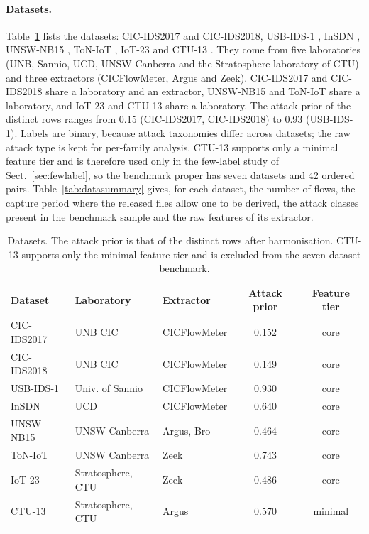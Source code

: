 \documentclass[pdflatex,sn-mathphys-num]{sn-jnl}%
\begin{document}
\paragraph{Datasets.}
Table~\ref{tab:datasets} lists the datasets: CIC-IDS2017 \citep{sharafaldin2018cicids} and CIC-IDS2018, USB-IDS-1 \citep{catillo2021usbids1}, InSDN \citep{elsayed2020insdn}, UNSW-NB15 \citep{moustafa2015unsw}, ToN-IoT \citep{alsaedi2020toniot}, IoT-23 \citep{garcia2020iot23} and CTU-13 \citep{garcia2014ctu13}.
They come from five laboratories (UNB, Sannio, UCD, UNSW Canberra and the Stratosphere laboratory of CTU) and three extractors (CICFlowMeter, Argus and Zeek).
CIC-IDS2017 and CIC-IDS2018 share a laboratory and an extractor, UNSW-NB15 and ToN-IoT share a laboratory, and IoT-23 and CTU-13 share a laboratory.
The attack prior of the distinct rows ranges from 0.15 (CIC-IDS2017, CIC-IDS2018) to 0.93 (USB-IDS-1).
Labels are binary, because attack taxonomies differ across datasets; the raw attack type is kept for per-family analysis.
CTU-13 supports only a minimal feature tier and is therefore used only in the few-label study of Sect.~\ref{sec:fewlabel}, so the benchmark proper has seven datasets and 42 ordered pairs.
Table~\ref{tab:datasummary} gives, for each dataset, the number of flows, the capture period where the released files allow one to be derived, the attack classes present in the benchmark sample and the raw features of its extractor.

\begin{table}[htbp]
\centering\small
\caption{Datasets. The attack prior is that of the distinct rows after harmonisation. CTU-13 supports only the minimal feature tier and is excluded from the seven-dataset benchmark.}\label{tab:datasets}
{\scriptsize\setlength{\tabcolsep}{2.5pt}\begin{tabular}{lllcc}
\toprule
Dataset & Laboratory & Extractor & Attack prior & Feature tier \\
\midrule
CIC-IDS2017 & UNB CIC & CICFlowMeter & 0.152 & core \\
CIC-IDS2018 & UNB CIC & CICFlowMeter & 0.149 & core \\
USB-IDS-1 & Univ. of Sannio & CICFlowMeter & 0.930 & core \\
InSDN & UCD & CICFlowMeter & 0.640 & core \\
UNSW-NB15 & UNSW Canberra & Argus, Bro & 0.464 & core \\
ToN-IoT & UNSW Canberra & Zeek & 0.743 & core \\
IoT-23 & Stratosphere, CTU & Zeek & 0.486 & core \\
CTU-13 & Stratosphere, CTU & Argus & 0.570 & minimal \\
\bottomrule
\end{tabular}}
\end{table}
\end{document}
